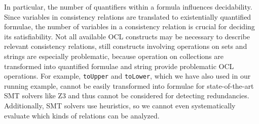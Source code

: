 In particular, the number of quantifiers within a formula influences decidability.
Since variables in consistency relations are translated to existentially quantified formulae, the number of variables in a consistency relation is crucial for deciding its satisfiability.
Not all available \gls{OCL} constructs may be necessary to describe relevant consistency relations, still constructs involving operations on sets and strings are especially problematic, because operation on collections are transformed into quantified formulae and string provide problematic \gls{OCL} operations.
For example, \texttt{toUpper} and \texttt{toLower}, which we have also used in our running example, cannot be easily transformed into formulae for state-of-the-art \gls{SMT} solvers like Z3 and thus cannot be considered for detecting redundancies.
Additionally, \gls{SMT} solvers use heuristics, so we cannot even systematically evaluate which kinds of relations can be analyzed.



